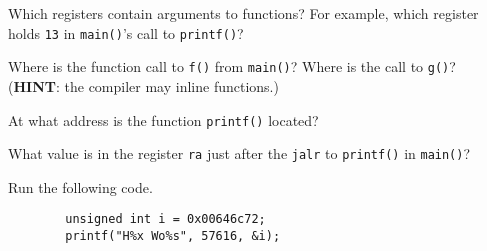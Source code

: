 \documentclass[11pt]{exam}
\begin{document}
\begin{questions}
    \question[3] Which registers contain arguments to functions? For example, which register holds \texttt{13} in \texttt{main()}'s call to \texttt{printf()}?
       
       \begin{solution}



       \end{solution}
    
    
    \question[2] Where is the function call to \texttt{f()} from \texttt{main()}? Where is the call to \texttt{g()}? (\textbf{HINT}: the compiler may inline functions.)
    
        \begin{solution}



        \end{solution}
    
    \question[2] At what address is the function \texttt{printf()} located?
        \begin{solution}



        \end{solution}
        
    
    \question[2] What value is in the register \texttt{ra} just after the \texttt{jalr} to \texttt{printf()} in \texttt{main()}?
    
        \begin{solution}



        \end{solution}
        
    \question[11] Run the following code.
    \begin{verbatim}
        unsigned int i = 0x00646c72;
        printf("H%x Wo%s", 57616, &i);
    \end{verbatim}
\end{questions}
\end{document}
